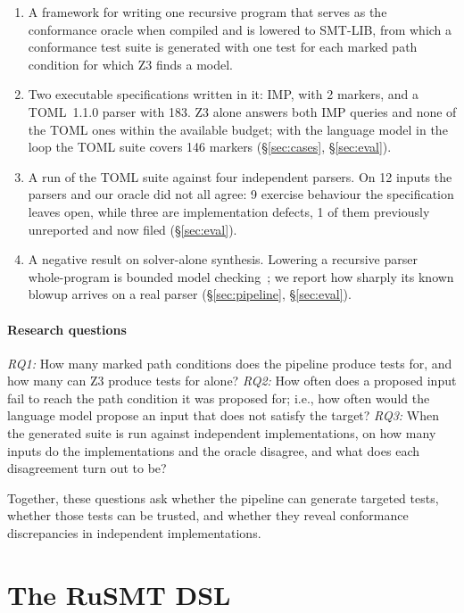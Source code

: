 \documentclass[sigconf,screen]{acmart}
\theoremstyle{definition}
\theoremstyle{remark}
\newcommand{\rusmt}{RuSMT}
\newcommand{\imp}{IMP}
\newcommand{\toml}{TOML}
\newcommand{\markers}{183}       %
\newcommand{\impmarkers}{2}      %
\newcommand{\certcount}{146}    %
\newcommand{\divmarkers}{12}   %
\newcommand{\newbugcount}{1}   %
\newcommand{\specopen}{9}      %
\begin{document}
\begin{enumerate}[leftmargin=1.4em,itemsep=1pt,topsep=2pt]
\item A framework for writing one recursive program that serves as the conformance oracle when compiled and is lowered to SMT-LIB, from which a conformance test suite is generated with one test for each marked path condition for which Z3 finds a model.
\item Two executable specifications written in it: \imp{}, with
\impmarkers{} markers, and a \toml{}~1.1.0 parser with
\markers{}. Z3 alone answers both
\imp{} queries and none of the \toml{} ones within the available budget; with the language model in the
loop the \toml{} suite covers \certcount{} markers (\S\ref{sec:cases}, \S\ref{sec:eval}).
\item A run of the \toml{} suite against four independent parsers. On
\divmarkers{} inputs the parsers and our oracle did not all agree: \specopen{} exercise behaviour the specification leaves open, while three are implementation defects, \newbugcount{} of them previously unreported and now filed (\S\ref{sec:eval}).
\item A negative result on solver-alone synthesis. Lowering a recursive parser
whole-program is bounded model checking~\cite{clarke2004cbmc,biere1999bmc}; we
report how sharply its known blowup arrives on a real parser (\S\ref{sec:pipeline}, \S\ref{sec:eval}).
\end{enumerate}

\paragraph{Research questions}
\emph{RQ1:} How many marked path conditions does the pipeline produce tests for, and how many can Z3 produce tests for alone?
\emph{RQ2:} How often does a proposed input fail to reach the path condition it was proposed for; i.e., how often would the language model propose an input that does not satisfy the target?
\emph{RQ3:} When the generated suite is run against independent implementations, on how many inputs do the implementations and the oracle disagree, and what does each disagreement turn out to be?

Together, these questions ask whether the pipeline can generate targeted tests, whether those tests can be trusted, and whether they reveal conformance discrepancies in independent implementations.

\section{The \rusmt{} DSL}
\label{sec:dsl}
\end{document}
